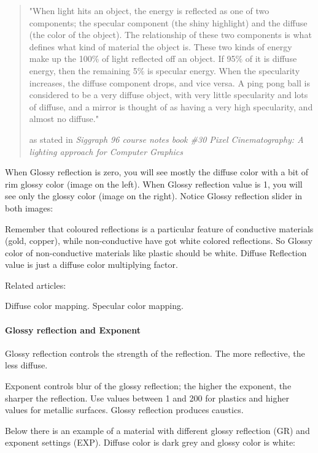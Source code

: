 \begin{quote}
"When light hits an object, the energy is reflected as one of two components; the specular component (the shiny highlight) and the diffuse (the color of the object). The relationship of these two components is what defines what kind of material the object is. These two kinds of energy make up the 100\% of light reflected off an object. If 95\% of it is diffuse energy, then the remaining 5\% is specular energy. When the specularity increases, the diffuse component drops, and vice versa. A ping pong ball is considered to be a very diffuse object, with very little specularity and lots of diffuse, and a mirror is thought of as having a very high specularity, and almost no diffuse."
\begin{flushright}
as stated in \textit{Siggraph 96 course notes book \#30 Pixel Cinematography: A lighting approach for Computer Graphics}
\end{flushright}
\end{quote}

When Glossy reflection is zero, you will see mostly the diffuse color with a bit of rim glossy color (image on the left). When Glossy reflection value is 1, you will see only the glossy color (image on the right). Notice Glossy reflection slider in both images:

Remember that coloured reflections is a particular feature of conductive materials (gold, copper), while non-conductive have got white colored reflections. So Glossy color of non-conductive materials like plastic should be white. Diffuse Reflection value is just a diffuse color multiplying factor.

Related articles:

Diffuse color mapping.
Specular color mapping.

\paragraph{Glossy reflection and Exponent}

Glossy reflection controls the strength of the reflection. The more reflective, the less diffuse.

Exponent controls blur of the glossy reflection; the higher the exponent, the sharper the reflection. Use values between 1 and 200 for plastics and higher values for metallic surfaces. Glossy reflection produces caustics.

Below there is an example of a material with different glossy reflection (GR) and exponent settings (EXP). Diffuse color is dark grey and glossy color is white:

